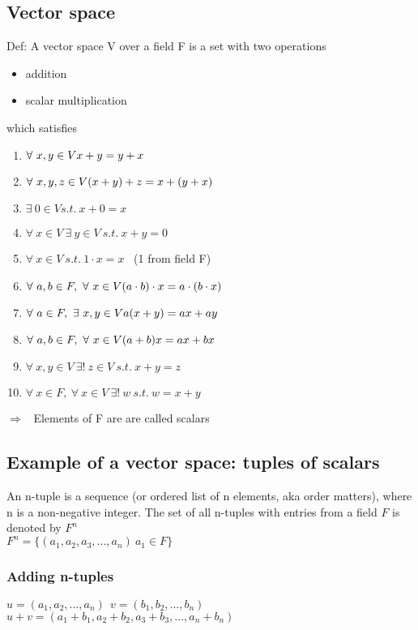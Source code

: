 \documentclass[a4paper]{article}
\begin{document}
\subsection{Vector space}
Def: A vector space V over a field F is a set with two operations
\begin{itemize}
	\item{addition}
	\item {scalar multiplication}
\end{itemize}
which satisfies
\begin{enumerate}
	\item{$\forall \ x,y \in V \\ x + y = y + x$}
	\item{$\forall \ x,y,z \in V \\ (x + y) + z = x + (y + x)$}
	\item{$\exists \ 0 \in V s.t. \ x + 0 = x $}
	\item{$\forall \ x \in V\ \exists \ y \in V\ s.t. \ x + y = 0$}
	\item{$\forall \ x \in V \ s.t. \ 1 \cdot x = x$ \ (1 from field F)}
	\item{$\forall \ a,b \in F, \  \forall \ x \in V \\ (a \cdot b) \cdot x = a \cdot ( b \cdot x)$}
	\item{$\forall \ a \in F, \ \exists \ x,y \in V \\ a(x + y) = ax + ay$}
	\item{$\forall \ a,b \in F, \ \forall \ x \in V \\ (a + b)x = ax + bx $}
	\item{$\forall \ x,y \in V\ \exists ! \ z \in V\ s.t. \ x + y = z$}
	\item{$\forall \ x \in F,\ \forall \ x \in V \ \exists ! \ w \ s.t. \ w = x + y$}
\end{enumerate}

$\Rightarrow$ \ Elements of F are are called scalars

\subsection{Example of a vector space: tuples of scalars}
An n-tuple is a sequence (or ordered list of n elements, aka order matters), where n is a non-negative integer. The set of all n-tuples with entries from a field $F$ is denoted by $F^n$\\
$F^n = \{(a_1, a_2, a_3, \dots, a_n) \ a_1 \in F\}$
\subsubsection{Adding n-tuples}
$u = (a_1, a_2,\dots, a_n) \ \ v = (b_1, b_2,\dots, b_n) $\\
$u + v = (a_1 + b_1, a_2 + b_2, a_3 + b_3, \dots, a_n + b_n)$
\end{document}
